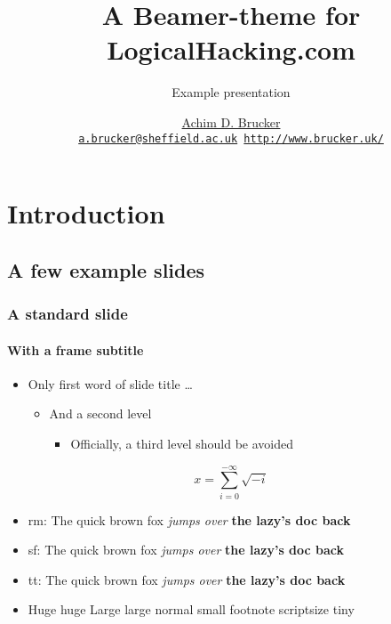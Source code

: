 \documentclass[inverse,aspectratio=169,classification=confidential]{lh-presentation}
\title{A Beamer-theme for LogicalHacking.com}
\subtitle{Example presentation}
\institute[The University of Sheffield]
{Department of Computer Science, The University of Sheffield, Sheffield, UK}
\author[A.D. Brucker] {%
    \href{http://www.brucker.uk/}{Achim D. Brucker}\\
    \texttt{\footnotesize\href{mailto:"Achim D. Brucker"
        <a.brucker@sheffield.ac.uk>}{a.brucker@sheffield.ac.uk}
      \hspace{.6cm}
      \url{http://www.brucker.uk/}}
    }
\begin{document}
\begin{frame}[plain]
  \maketitle
\end{frame}

\AgendaFrame

\section{Introduction}
\subsection{A few example slides}
\frame{\sectionpage}
\begin{frame}[classification={confidential}]
  \frametitle{A standard slide}
  \framesubtitle{With a frame subtitle}
  \begin{itemize}
  \item Only first word of slide title \ldots
    \begin{itemize}
    \item  And a second level 
      \begin{itemize}
      \item  Officially, a third level should be avoided
      \end{itemize}
    \end{itemize}
  \end{itemize}
  \[ x = \sum_{i=0}^{-\infty}\sqrt{-i}\]
\begin{itemize}
\item rm: {\rmfamily The quick {\mdseries brown fox} \emph{jumps over} \textbf{the lazy's doc back}}
\item sf: {\sffamily The quick {\mdseries brown fox} \emph{jumps over} \textbf{the lazy's doc back}}
\item tt: {\ttfamily The quick {\mdseries brown fox} \emph{jumps over} \textbf{the lazy's doc back}}
\item {\Huge Huge} {\huge huge} {\Large Large} {\large large} {\normalsize normal} {\small small} 
      {\footnotesize footnote} {\scriptsize scriptsize} {\tiny tiny}
\end{itemize}
\end{frame}
\end{document}

